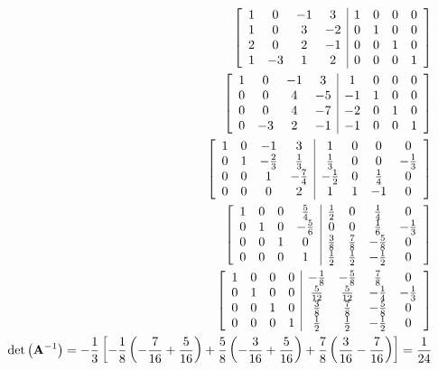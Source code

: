 \documentclass[12pt]{article}
\begin{document}
\begin{enumerate}
\begin{enumerate}
        \begin{equation*}
          \begin{split}
          \left[ \begin{array}{c c c c | c c c c} 1 & 0 & -1 & 3& 1 & 0 & 0 & 0\\ 1 & 0 & 3 & -2 & 0 & 1 & 0 & 0\\ 2 & 0 & 2 & -1 & 0 & 0 & 1 & 0\\ 1 & -3 & 1 & 2 & 0 & 0 & 0 & 1  \end{array} \right]\\
          \left[ \begin{array}{c c c c | c c c c} 1 & 0 & -1 & 3& 1 & 0 & 0 & 0\\ 0 & 0 & 4 & -5 & -1 & 1 & 0 & 0\\ 0 & 0 & 4 & -7 & -2 & 0 & 1 & 0\\ 0 & -3 & 2 & -1 & -1 & 0 & 0 & 1  \end{array} \right]\\
          \left[ \begin{array}{c c c c | c c c c} 1 & 0 & -1 & 3& 1 & 0 & 0 & 0\\ 0 & 1 & -\frac{2}{3} & \frac{1}{3} & \frac{1}{3} & 0 & 0 & -\frac{1}{3} \\ 0 & 0 & 1 & -\frac{7}{4} & -\frac{1}{2} & 0 & \frac{1}{4} & 0\\ 0 & 0 & 0 & 2 & 1 & 1 & -1 & 0\\  \end{array} \right]\\
          \left[ \begin{array}{c c c c | c c c c} 1 & 0 & 0 & \frac{5}{4} & \frac{1}{2} & 0 & \frac{1}{4} & 0\\ 0 & 1 & 0 & -\frac{5}{6} & 0 & 0 & \frac{1}{6} & -\frac{1}{3} \\ 0 & 0 & 1 & 0 & \frac{3}{8} & \frac{7}{8} & -\frac{5}{8} & 0\\ 0 & 0 & 0 & 1 & \frac{1}{2} & \frac{1}{2} & -\frac{1}{2} & 0\\  \end{array} \right]\\
          \left[ \begin{array}{c c c c | c c c c} 1 & 0 & 0 & 0 & -\frac{1}{8} & -\frac{5}{8} & \frac{7}{8} & 0\\ 0 & 1 & 0 & 0 & \frac{5}{12} & \frac{5}{12} & -\frac{1}{4} & -\frac{1}{3} \\ 0 & 0 & 1 & 0 & \frac{3}{8} & \frac{7}{8} & -\frac{5}{8} & 0\\ 0 & 0 & 0 & 1 & \frac{1}{2} & \frac{1}{2} & -\frac{1}{2} & 0\\  \end{array} \right]\\
          \det\left( \bold{A}^{-1} \right)=-\frac{1}{3}\left[ -\frac{1}{8}\left( -\frac{7}{16}+\frac{5}{16}  \right)+\frac{5}{8}\left( -\frac{3}{16}+\frac{5}{16} \right)+\frac{7}{8}\left( \frac{3}{16}-\frac{7}{16} \right) \right]=\frac{1}{24}
          \end{split}
          \label{1}
        \end{equation}


\end{equation*}
\end{enumerate}
\end{enumerate}
\end{document}

